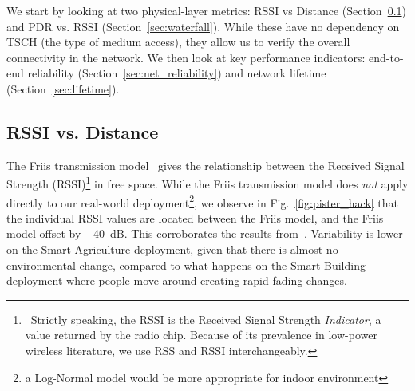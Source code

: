 \documentclass{elsarticle}
\newcommand{\building}            {Smart Building\xspace}
\newcommand{\agri}                {Smart Agriculture\xspace}
\begin{document}

We start by looking at two physical-layer metrics:
    RSSI vs Distance (Section~\ref{sec:rssi_distance}) and
    PDR vs. RSSI (Section~\ref{sec:waterfall}).
While these have no dependency on TSCH (the type of medium access), they allow us to verify the overall connectivity in the network.
We then look at key performance indicators:
    end-to-end reliability (Section~\ref{sec:net_reliability}) and
    network lifetime (Section~\ref{sec:lifetime}).

\subsection{RSSI vs. Distance}
\label{sec:rssi_distance}

The Friis transmission model~\cite{saunders07antennas} gives the relationship between the Received Signal Strength (RSSI)\footnote{~Strictly speaking, the RSSI is the Received Signal Strength \textit{Indicator}, a value returned by the radio chip. Because of its prevalence in low-power wireless literature, we use RSS and RSSI interchangeably.} in free space.
While the Friis transmission model does \textit{not} apply directly to our real-world deployment\footnote{a Log-Normal model would be more appropriate for indoor environment}, we observe in Fig.~\ref{fig:pister_hack} that the individual RSSI values are located between the Friis model, and the Friis model offset by $-$40~dB.
This corroborates the results from~\cite{zats10wireless}.
Variability is lower on the \agri deployment, given that there is almost no environmental change, compared to what happens on the \building deployment where people move around creating rapid fading changes.
\end{document}
